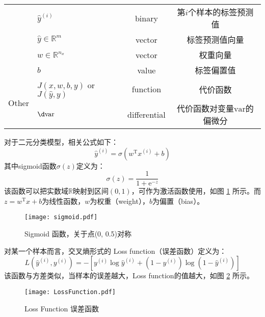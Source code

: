 \begin{table}[htb!]
\begin{threeparttable}
\begin{tabular}{clcc}
                                    & $\hat{y}^{(i)}$                           & binary               & 第$i$个样本的标签预测值                                                  \\
                                    & $\hat{y} \in {\mathbb{R}^{m}}$            & vector               & 标签预测值向量   					                                     \\
                                    & $w \in \mathbb{R}^{n_x}$                  & vector               & 权重向量                                                                \\
                                    & $b$                                       & value                & 标签偏置值                                                            \\ \hline
        \multirow{2}{*}{Other}      & $J(x,w,b,y)$ or $J(\hat{y},y)$            & function             & 代价函数                                                               \\
                                    & $\d \mathrm{var}$                  & differential         & 代价函数对变量$\mathrm{var}$的偏微分                                    \\ \hline
    \end{tabular}
    \label{tab:notations_LR}
    \end{threeparttable}
\end{table}

对于二元分类模型，相关公式如下：
\begin{equation}
    \hat{y}^{(i)} = \sigma(w^\mathrm{T} x^{(i)} + b) \label{eq:logistic}
\end{equation}
其中sigmoid函数$\sigma(z)$定义为：
\begin{equation}
    \sigma(z) = \frac{1}{1 + \mathrm{e}^{-z}} \label{eq:sigmoid}
\end{equation}
该函数可以把实数域$\mathbb{R}$映射到区间$(0, 1)$，可作为激活函数使用，如图 \ref{fig:sigmoid} 所示。而$z = w^\mathrm{T} x + b$为线性函数，$w$为权重（weight），$b$为偏置（bias）。
\begin{figure}[h!b]
    \centering
    \texttt{[image: sigmoid.pdf]}
    \caption{Sigmoid 函数，关于点(0, 0.5)对称}
    \label{fig:sigmoid}
\end{figure}

对某一个样本而言，交叉熵形式的 Loss function（误差函数）定义为：
\begin{equation}
    L(\hat{y}^{(i)}, y^{(i)}) = -\left[y^{(i)} \log \hat{y}^{(i)} + (1 - y^{(i)}) \log (1 - \hat{y}^{(i)})\right] \label{eq:loss}
\end{equation}
该函数与方差类似，当样本的误差越大，Loss function的值越大，如图 \ref{fig:loss} 所示。
\begin{figure}[h!b]
    \centering
    \texttt{[image: LossFunction.pdf]}
    \caption{Loss Function 误差函数}
    \label{fig:loss}
\end{figure}

